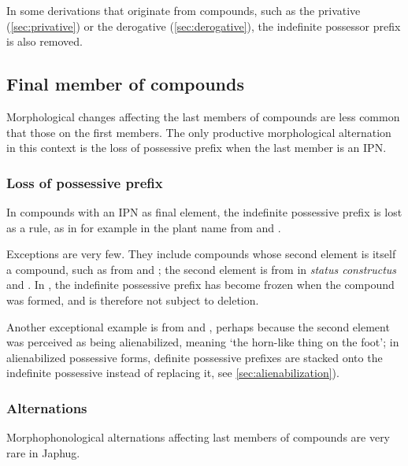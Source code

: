 In some derivations that originate from compounds, such as the privative (\ref{sec:privative}) or the derogative  (\ref{sec:derogative}), the indefinite possessor prefix is also removed.

\subsection{Final member of compounds} \label{sec:final.compounds}
Morphological changes affecting the last members of compounds are less common that those on the first members. The only productive morphological alternation in this context is the loss of possessive prefix when the last member is an IPN.

\subsubsection{Loss of possessive prefix} \label{sec:possessive.prefix.second.compounds}
In compounds with an IPN as final element, the indefinite possessive prefix is lost as a rule, as in for example in the plant name  from  and .

Exceptions are very few. They include compounds whose second element is itself a compound, such as  from  and ; the second element is from  in \textit{status constructus} and . In , the indefinite possessive prefix  has become frozen when the compound  was formed, and is therefore not subject to deletion.

Another exceptional example is  from  and , perhaps because the second element was perceived as being alienabilized, meaning `the horn-like thing on the foot'; in alienabilized possessive forms, definite possessive prefixes are stacked onto the indefinite possessive instead of replacing it,  see \ref{sec:alienabilization}).

\subsubsection{Alternations} \label{sec:second.member.alternation} 
Morphophonological alternations affecting last members of compounds are very rare in Japhug. 

